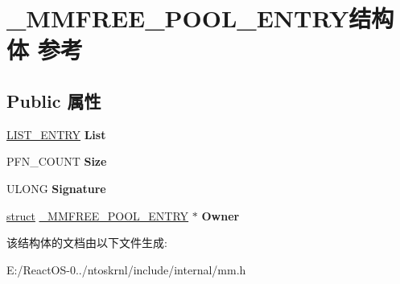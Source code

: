 \hypertarget{struct___m_m_f_r_e_e___p_o_o_l___e_n_t_r_y}{}\section{\+\_\+\+M\+M\+F\+R\+E\+E\+\_\+\+P\+O\+O\+L\+\_\+\+E\+N\+T\+R\+Y结构体 参考}
\label{struct___m_m_f_r_e_e___p_o_o_l___e_n_t_r_y}
\subsection*{Public 属性}
\begin{DoxyCompactItemize}
\item 
\mbox{\label{struct___m_m_f_r_e_e___p_o_o_l___e_n_t_r_y_acbfa6e3ef1141d222313facf2cbeb422}} 
\hyperlink{struct___l_i_s_t___e_n_t_r_y}{L\+I\+S\+T\+\_\+\+E\+N\+T\+RY} {\bfseries List}
\item 
\mbox{\label{struct___m_m_f_r_e_e___p_o_o_l___e_n_t_r_y_a965d62d00eaff8c6c87fd6229f9f289a}} 
P\+F\+N\+\_\+\+C\+O\+U\+NT {\bfseries Size}
\item 
\mbox{\label{struct___m_m_f_r_e_e___p_o_o_l___e_n_t_r_y_a8363e53018513ff464789e69cba6514a}} 
U\+L\+O\+NG {\bfseries Signature}
\item 
\mbox{\label{struct___m_m_f_r_e_e___p_o_o_l___e_n_t_r_y_a84f9d7d6b5b05073ddd9f4d52d97b723}} 
\hyperlink{interfacestruct}{struct} \hyperlink{struct___m_m_f_r_e_e___p_o_o_l___e_n_t_r_y}{\+\_\+\+M\+M\+F\+R\+E\+E\+\_\+\+P\+O\+O\+L\+\_\+\+E\+N\+T\+RY} $\ast$ {\bfseries Owner}
\end{DoxyCompactItemize}


该结构体的文档由以下文件生成\+:\begin{DoxyCompactItemize}
\item 
E\+:/\+React\+O\+S-\/0../ntoskrnl/include/internal/mm.\+h\end{DoxyCompactItemize}
